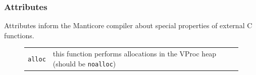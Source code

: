 \documentclass[11pt]{article}
\begin{document}
\subsubsection{Attributes}
Attributes inform the Manticore compiler about special properties of external C functions.

\begin{figure}
  \begin{center}
    \begin{tabular}{cl}
      {\tt alloc} & this function performs allocations in the VProc heap (should be {\tt noalloc})
    \end{tabular}
  \end{center}
  \label{fig:c-attributes}
\end{figure}
\end{document}

